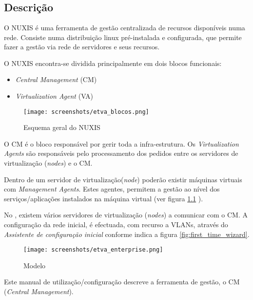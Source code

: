 \chapter{\textsf{\acronym}}
\section*{Descrição}
O NUXIS é uma ferramenta de gestão centralizada de recursos disponíveis numa rede. Consiste numa distribuição linux pré-instalada e configurada, que permite fazer a gestão via rede de servidores e seus recursos.

O NUXIS encontra-se dividida principalmente em dois blocos funcionais:

\begin{itemize}
	\item \emph{Central Management} (CM)
        \item \emph{Virtualization Agent} (VA)
\end{itemize}

\begin{figure}[H]
	\begin{center}
	\texttt{[image: screenshots/etva\_blocos.png]}
	\caption{Esquema geral do NUXIS}
	\label{fig:etva_blocos}
	\end{center}
\end{figure}

O CM é o bloco responsável por gerir toda a infra-estrutura.
Os \emph{Virtualization Agents} são responsáveis pelo processamento dos pedidos entre os servidores de virtualização (\emph{nodes}) e o CM.

Dentro de um servidor de virtualização(\emph{node}) poderão existir máquinas virtuais com \emph{Management Agents}. Estes agentes, permitem a gestão ao nível dos serviços/aplicações instalados na máquina virtual (ver figura \ref{fig:etva_blocos} ).

No \acronym, existem vários servidores de virtualização (\emph{nodes}) a comunicar com o CM. A configuração da rede inicial, é efectuada, com recurso a VLANs, através do \emph{Assistente de configuração inicial} conforme indica a figura \ref{fig:first_time_wizard}.
\begin{figure}[H]
    \begin{center}
	\texttt{[image: screenshots/etva\_enterprise.png]}
	\caption{Modelo \acronym}
	\label{fig:etva_enterprise}
	\end{center}
\end{figure}
 
Este manual de utilização/configuração descreve a ferramenta de gestão, o CM (\emph{Central Management}).

\pagebreak
%
